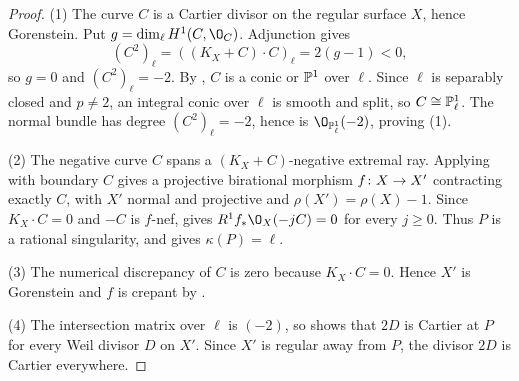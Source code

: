 \begin{proof}
(1) The curve $C$ is a Cartier divisor on the regular surface $X$, hence Gorenstein.
Put $g = \dim_\ell H^1(C,\O_C)$.
Adjunction gives
\[
  (C^2)_\ell = ((K_X+C)\cdot C)_\ell = 2(g-1)<0,
\]
so $g = 0$ and $(C^2)_\ell = -2$.
By \cite[Lemma~10.6(3)]{Kol13}, $C$ is a conic or $\mathbb{P}^1$ over $\ell$.
Since $\ell$ is separably closed and $p\neq 2$, an integral conic over $\ell$ is smooth and split, so $C\cong\mathbb{P}^1_\ell$.
The normal bundle has degree $(C^2)_\ell = -2$, hence is $\O_{\PP^1_\ell}(-2)$, proving (1).

(2) The negative curve $C$ spans a $(K_X+C)$-negative extremal ray.
Applying \cite[Theorem~4.4]{Tan18} with boundary $C$ gives a projective birational morphism $f\colon X\to X'$ contracting exactly $C$, with $X'$ normal and projective and $\rho(X') = \rho(X)-1$.
Since $K_X\cdot C = 0$ and $-C$ is $f$-nef, \cite[Theorem~10.4]{Kol13} gives $R^1f_*\O_X(-jC) = 0$ for every $j\geq 0$.
Thus $P$ is a rational singularity, and \cite[Proposition~10.9(4)]{Kol13} gives $\kappa(P) = \ell$.

(3) The numerical discrepancy of $C$ is zero because $K_X\cdot C = 0$.
Hence $X'$ is Gorenstein and $f$ is crepant by \cite[Theorem~2.29(2)]{Kol13}.

(4) The intersection matrix over $\ell$ is $(-2)$, so \cite[Proposition~10.9(3)]{Kol13} shows that $2D$ is Cartier at $P$ for every Weil divisor $D$ on $X'$.
Since $X'$ is regular away from $P$, the divisor $2D$ is Cartier everywhere.


\end{proof}
